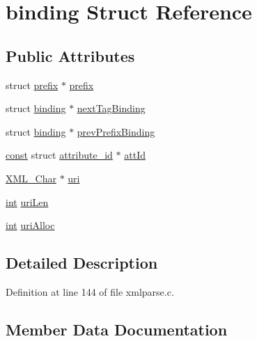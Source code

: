 \hypertarget{structbinding}{}\section{binding Struct Reference}
\label{structbinding}
\subsection*{Public Attributes}
\begin{DoxyCompactItemize}
\item 
struct \hyperlink{structprefix}{prefix} $\ast$ \hyperlink{structbinding_ad4d0033f0aabb4e3d0583ac1ccece910}{prefix}
\item 
struct \hyperlink{structbinding}{binding} $\ast$ \hyperlink{structbinding_abfdfde4719bd9a7d3ceee16838fd7a10}{next\+Tag\+Binding}
\item 
struct \hyperlink{structbinding}{binding} $\ast$ \hyperlink{structbinding_a05786d24cece6279995fec18085518af}{prev\+Prefix\+Binding}
\item 
\hyperlink{getopt1_8c_a2c212835823e3c54a8ab6d95c652660e}{const} struct \hyperlink{structattribute__id}{attribute\+\_\+id} $\ast$ \hyperlink{structbinding_a302c6150bfe8f4db1bedc08623cf07fc}{att\+Id}
\item 
\hyperlink{amiga_2include_2libraries_2expat_8h_a63da96463e775e1ec3a7d1f076208127}{X\+M\+L\+\_\+\+Char} $\ast$ \hyperlink{structbinding_a4d6ad4c6a6ce3415ba75b719f404d1db}{uri}
\item 
\hyperlink{xmltok_8h_a5a0d4a5641ce434f1d23533f2b2e6653}{int} \hyperlink{structbinding_ad48e2bfeac05e47551507fe035c94569}{uri\+Len}
\item 
\hyperlink{xmltok_8h_a5a0d4a5641ce434f1d23533f2b2e6653}{int} \hyperlink{structbinding_ae35a6d0491a565baa5648102a33aeef8}{uri\+Alloc}
\end{DoxyCompactItemize}


\subsection{Detailed Description}


Definition at line 144 of file xmlparse.\+c.



\subsection{Member Data Documentation}
